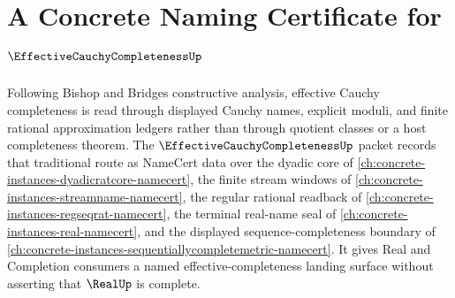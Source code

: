 \chapter{A Concrete Naming Certificate for $\EffectiveCauchyCompletenessUp$}
\label{ch:concrete-instances-effective-cauchy-completeness-namecert}

Following Bishop and Bridges constructive analysis, effective Cauchy completeness is read through displayed Cauchy names, explicit moduli, and finite rational approximation ledgers rather than through quotient classes or a host completeness theorem. The $\EffectiveCauchyCompletenessUp$ packet records that traditional route as NameCert data over the dyadic core of \autoref{ch:concrete-instances-dyadicratcore-namecert}, the finite stream windows of \autoref{ch:concrete-instances-streamname-namecert}, the regular rational readback of \autoref{ch:concrete-instances-regseqrat-namecert}, the terminal real-name seal of \autoref{ch:concrete-instances-real-namecert}, and the displayed sequence-completeness boundary of \autoref{ch:concrete-instances-sequentiallycompletemetric-namecert}. It gives Real and Completion consumers a named effective-completeness landing surface without asserting that $\RealUp$ is complete.

